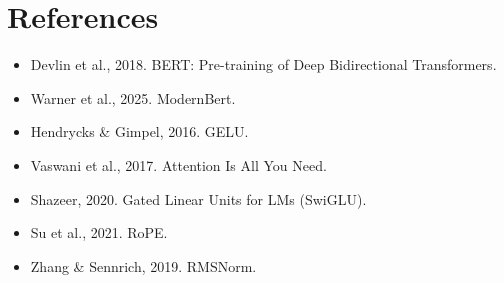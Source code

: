 \documentclass[11pt]{article}
\begin{document}
\section*{References}
\begin{itemize}
\item Devlin et al., 2018. BERT: Pre-training of Deep Bidirectional Transformers.
\item Warner et al., 2025. ModernBert.
\item Hendrycks \& Gimpel, 2016. GELU.
\item Vaswani et al., 2017. Attention Is All You Need.
\item Shazeer, 2020. Gated Linear Units for LMs (SwiGLU).
\item Su et al., 2021. RoPE.
\item Zhang \& Sennrich, 2019. RMSNorm.
\end{itemize}
\end{document}
